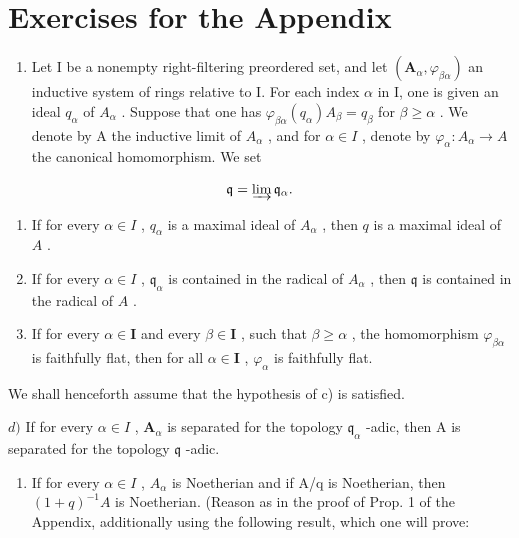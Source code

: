 \section*{Exercises for the Appendix}
{}

\begin{enumerate}
\def\labelenumi{\arabic{enumi})}
\tightlist
\item
  Let I be a nonempty right-filtering preordered set, and let \((\mathbf{A}_{\alpha}, \varphi_{\beta\alpha})\) an inductive system of rings relative to I. For each index \(\alpha\) in I, one is given an ideal \(q_{\alpha}\) of \(A_{\alpha}\) . Suppose that one has \(\varphi_{\beta\alpha}(q_{\alpha}) A_{\beta} = q_{\beta}\) for \(\beta \geqslant \alpha\) . We denote by A the inductive limit of \(A_{\alpha}\) , and for \(\alpha \in I\) , denote by \(\varphi_{\alpha}: A_{\alpha} \to A\) the canonical homomorphism. We set
\end{enumerate}

\[
\mathfrak {q} = \varinjlim \mathfrak {q} _ {\alpha}.
\]

\begin{enumerate}
\def\labelenumi{\alph{enumi})}
\item
  If for every \(\alpha \in I\) , \(q_{\alpha}\) is a maximal ideal of \(A_{\alpha}\) , then \(q\) is a maximal ideal of \(A\) .
\item
  If for every \(\alpha \in I\) , \(\mathfrak{q}_{\alpha}\) is contained in the radical of \(A_{\alpha}\) , then \(\mathfrak{q}\) is contained in the radical of \(A\) .
\item
  If for every \(\alpha\in\mathbf{I}\) and every \(\beta\in\mathbf{I}\) , such that \(\beta\geqslant\alpha\) , the homomorphism \(\varphi_{\beta\alpha}\) is faithfully flat, then for all \(\alpha\in\mathbf{I}\) , \(\varphi_{\alpha}\) is faithfully flat.
\end{enumerate}

We shall henceforth assume that the hypothesis of c) is satisfied.

\(d)\) If for every \(\alpha\in I\) , \(\mathbf{A}_{\alpha}\) is separated for the topology \(\mathfrak{q}_{\alpha}\) -adic, then A is separated for the topology \(\mathfrak{q}\) -adic.

\begin{enumerate}
\def\labelenumi{\alph{enumi})}
\setcounter{enumi}{4}
\tightlist
\item
  If for every \(\alpha \in I\) , \(A_{\alpha}\) is Noetherian and if A/q is Noetherian, then \((1 + q)^{-1}A\) is Noetherian. (Reason as in the proof of Prop. 1 of the Appendix, additionally using the following result, which one will prove:
\end{enumerate}

